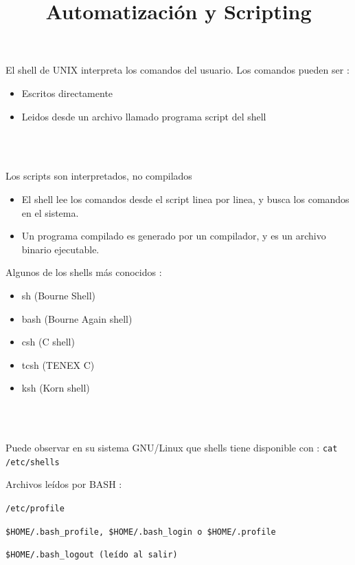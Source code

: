 \documentclass{beamer}
\title{Automatización y Scripting}
\begin{document}
\begin{frame}
  \titlepage
\end{frame}





\begin{frame}{}
El shell de UNIX interpreta los comandos del usuario. Los comandos pueden ser :
\begin{itemize}
\item Escritos directamente 
\item Leidos desde un archivo llamado programa script del shell 
\end{itemize}
\\ \

Los scripts son interpretados, no compilados
\begin{itemize}
\item El shell lee los comandos desde el script linea por linea, y busca los comandos en el sistema.
\item Un programa compilado es generado por un compilador, y es un archivo binario ejecutable.
\end{itemize}

\end{frame}


\begin{frame}{}
Algunos de los shells más conocidos : 
\begin{itemize}
\item sh (Bourne Shell)
\item bash (Bourne Again shell)
\item csh (C shell)
\item tcsh (TENEX C)
\item ksh (Korn shell)
\end{itemize}
\\ \

Puede observar en su sistema GNU/Linux que shells tiene disponible con : \texttt{cat /etc/shells}


\end{frame}


\begin{frame}{}
Archivos leídos por BASH : 

\texttt{/etc/profile}

\texttt{\$HOME/.bash\_profile, \$HOME/.bash\_login o \$HOME/.profile }

\texttt{\$HOME/.bash\_logout (leído al salir) }

\end{frame}
\end{document}
